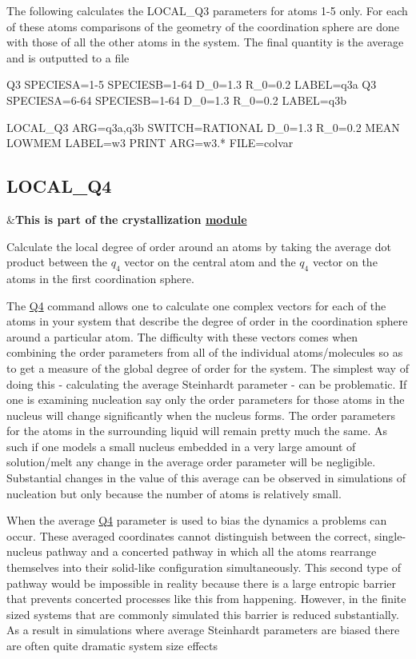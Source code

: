 The following calculates the L\+O\+C\+A\+L\+\_\+\+Q3 parameters for atoms 1-\/5 only. For each of these atoms comparisons of the geometry of the coordination sphere are done with those of all the other atoms in the system. The final quantity is the average and is outputted to a file

\begin{DoxyVerb}Q3 SPECIESA=1-5 SPECIESB=1-64 D_0=1.3 R_0=0.2 LABEL=q3a
Q3 SPECIESA=6-64 SPECIESB=1-64 D_0=1.3 R_0=0.2 LABEL=q3b

LOCAL_Q3 ARG=q3a,q3b SWITCH={RATIONAL D_0=1.3 R_0=0.2} MEAN LOWMEM LABEL=w3
PRINT ARG=w3.* FILE=colvar
\end{DoxyVerb}
 \hypertarget{LOCAL_Q4}{}\subsection{L\+O\+C\+A\+L\+\_\+\+Q4}\label{LOCAL_Q4}
\begin{TabularC}{2}
\hline
&{\bfseries  This is part of the crystallization \hyperlink{mymodules}{module }}   \\
\end{TabularC}
Calculate the local degree of order around an atoms by taking the average dot product between the $q_4$ vector on the central atom and the $q_4$ vector on the atoms in the first coordination sphere.

The \hyperlink{Q4}{Q4} command allows one to calculate one complex vectors for each of the atoms in your system that describe the degree of order in the coordination sphere around a particular atom. The difficulty with these vectors comes when combining the order parameters from all of the individual atoms/molecules so as to get a measure of the global degree of order for the system. The simplest way of doing this -\/ calculating the average Steinhardt parameter -\/ can be problematic. If one is examining nucleation say only the order parameters for those atoms in the nucleus will change significantly when the nucleus forms. The order parameters for the atoms in the surrounding liquid will remain pretty much the same. As such if one models a small nucleus embedded in a very large amount of solution/melt any change in the average order parameter will be negligible. Substantial changes in the value of this average can be observed in simulations of nucleation but only because the number of atoms is relatively small.

When the average \hyperlink{Q4}{Q4} parameter is used to bias the dynamics a problems can occur. These averaged coordinates cannot distinguish between the correct, single-\/nucleus pathway and a concerted pathway in which all the atoms rearrange themselves into their solid-\/like configuration simultaneously. This second type of pathway would be impossible in reality because there is a large entropic barrier that prevents concerted processes like this from happening. However, in the finite sized systems that are commonly simulated this barrier is reduced substantially. As a result in simulations where average Steinhardt parameters are biased there are often quite dramatic system size effects

